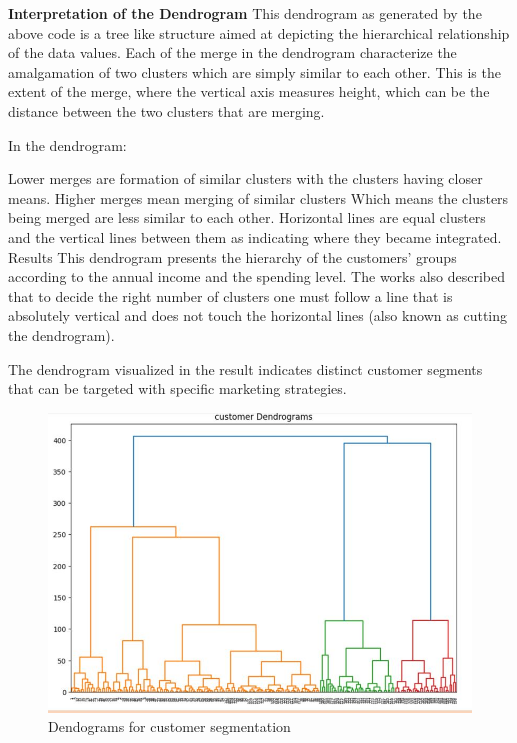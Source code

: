 \documentclass[conference]{IEEEtran}
\begin{document}
\textbf{Interpretation of the Dendrogram}
This dendrogram as generated by the above code is a tree like structure aimed at depicting the hierarchical relationship of the data values. Each of the merge in the dendrogram characterize the amalgamation of two clusters which are simply similar to each other. This is the extent of the merge, where the vertical axis measures height, which can be the distance between the two clusters that are merging.

In the dendrogram:

Lower merges are formation of similar clusters with the clusters having closer means.
Higher merges mean merging of similar clusters Which means the clusters being merged are less similar to each other.
Horizontal lines are equal clusters and the vertical lines between them as indicating where they became integrated.
Results
This dendrogram presents the hierarchy of the customers’ groups according to the annual income and the spending level. The works also described that to decide the right number of clusters one must follow a line that is absolutely vertical and does not touch the horizontal lines (also known as cutting the dendrogram).

The dendrogram visualized in the result indicates distinct customer segments that can be targeted with specific marketing strategies.\cite{roux2018comparative}

\begin{figure}
    \centering
    \includegraphics[width=0.6\linewidth]{Dendograms for customer segmentation.JPG}
    \caption{Dendograms for customer segmentation}
    \label{fig:enter-label}
\end{figure}
\end{document}
